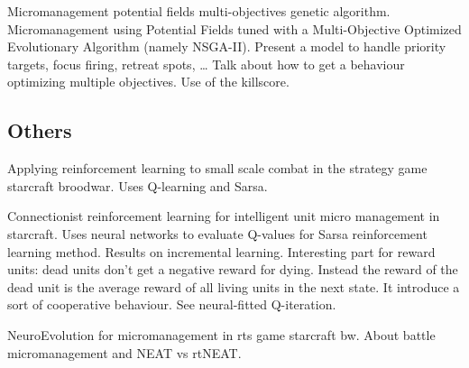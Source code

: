 Micromanagement potential fields multi-objectives genetic algorithm. Micromanagement using Potential Fields tuned with a Multi-Objective Optimized Evolutionary Algorithm (namely NSGA-II). Present a model to handle priority targets, focus firing, retreat spots, … Talk about how to get a behaviour optimizing multiple objectives. Use of the killscore.

\citet{SiSuBa14}

\subsection{Others}

Applying reinforcement learning to small scale combat in the strategy game starcraft broodwar. Uses Q-learning and Sarsa.

Connectionist reinforcement learning for intelligent unit micro management in starcraft.
Uses neural networks to evaluate Q-values for Sarsa reinforcement learning method. Results on incremental learning.
Interesting part for reward units: dead units don’t get a negative reward for dying.
Instead the reward of the dead unit is the average reward of all living units in the next state.
It introduce a sort of cooperative behaviour. See neural-fitted Q-iteration.

NeuroEvolution for micromanagement in rts game starcraft bw. About battle micromanagement and NEAT vs rtNEAT.

